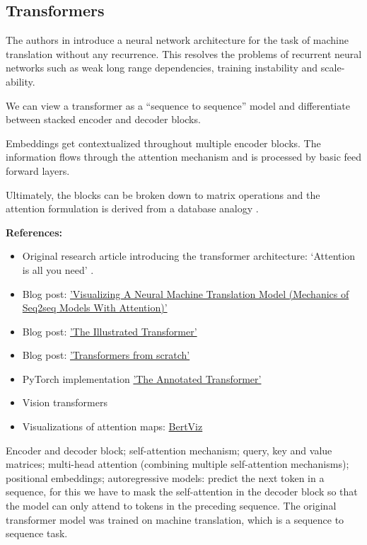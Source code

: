 \documentclass[11pt, a4paper]{amsart}
\begin{document}
\subsection{Transformers}

The authors in \cite{DBLP:journals/corr/VaswaniSPUJGKP17} introduce a neural network architecture for the task of machine translation without any recurrence. 
This resolves the problems of recurrent neural networks such as weak long range dependencies, training instability and scale-ability.

We can view a transformer as a ``sequence to sequence'' model and differentiate between stacked encoder and decoder blocks.

Embeddings get contextualized throughout multiple encoder blocks.
The information flows through the attention mechanism and is processed by basic feed forward layers. 

Ultimately, the blocks can be broken down to matrix operations and the attention formulation is derived from a database analogy \cite{pmlr-v139-schlag21a}.

\noindent \textbf{References:}
\begin{itemize}
	\item {Original research article introducing the transformer architecture:} `Attention is all you need' \cite{DBLP:journals/corr/VaswaniSPUJGKP17}.
	\item Blog post:
	\href{https://jalammar.github.io/visualizing-neural-machine-translation-mechanics-of-seq2seq-models-with-attention/}{'Visualizing A Neural Machine Translation Model (Mechanics of Seq2seq Models With Attention)'}
	\item Blog post:
	\href{https://jalammar.github.io/illustrated-transformer/}{'The Illustrated Transformer'}
	\item Blog post:
	\href{http://peterbloem.nl/blog/transformers}{'Transformers from scratch'}
	\item PyTorch implementation \href{https://nlp.seas.harvard.edu/2018/04/03/attention.html}{'The Annotated Transformer'}
	\item Vision transformers \cite{dosovitskiy2021an}
	\item Visualizations of attention maps:
	\href{https://github.com/jessevig/bertviz}{BertViz}
\end{itemize}

{
	\color{blue}
	
	Encoder and decoder block; self-attention mechanism; query, key and value matrices; multi-head attention (combining multiple self-attention mechanisms); positional embeddings; autoregressive models: predict the next token in a sequence, for this we have to mask the self-attention in the decoder block so that the model can only attend to tokens in the preceding sequence.
	The original transformer model was trained on machine translation, which is a sequence to sequence task.
} %
\end{document}
